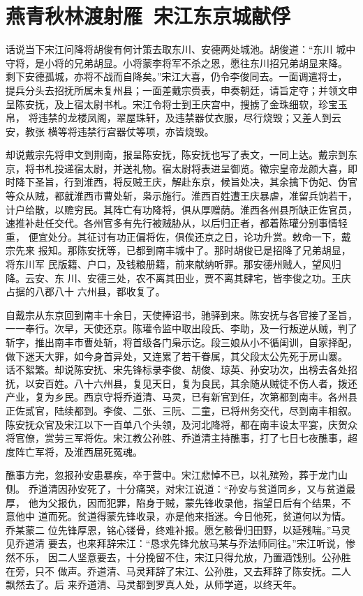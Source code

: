 \chapter{燕青秋林渡射雁~宋江东京城献俘}

话说当下宋江问降将胡俊有何计策去取东川、安德两处城池。胡俊道：“东川
城中守将，是小将的兄弟胡显。小将蒙李将军不杀之恩，愿往东川招兄弟胡显来降。
剩下安德孤城，亦将不战而自降矣。”宋江大喜，仍令李俊同去。一面调遣将士，
提兵分头去招抚所属未复州县；一面差戴宗赍表，申奏朝廷，请旨定夺；并领文申
呈陈安抚，及上宿太尉书札。宋江令将士到王庆宫中，搜掳了金珠细软，珍宝玉帛，
将违禁的龙楼凤阁，翠屋珠轩，及违禁器仗衣服，尽行烧毁；又差人到云安，教张
横等将违禁行宫器仗等项，亦皆烧毁。

却说戴宗先将申文到荆南，报呈陈安抚，陈安抚也写了表文，一同上达。戴宗到东
京，将书札投递宿太尉，并送礼物。宿太尉将表进呈御览。徽宗皇帝龙颜大喜，即
时降下圣旨，行到淮西，将反贼王庆，解赴东京，候旨处决，其余擒下伪妃、伪官
等众从贼，都就淮西市曹处斩，枭示施行。淮西百姓遭王庆暴虐，准留兵饷若干，
计户给散，以赡穷民。其阵亡有功降将，俱从厚赠荫。淮西各州县所缺正佐官员，
速推补赴任交代。各州官多有先行被贼胁从，以后归正者，都着陈瓘分别事情轻重，
便宜处分。其征讨有功正偏将佐，俱俟还京之日，论功升赏。敕命一下，戴宗先来
报知。那陈安抚等，已都到南丰城中了。那时胡俊已是招降了兄弟胡显，将东川军
民版籍、户口，及钱粮册籍，前来献纳听罪。那安德州贼人，望风归降。云安、东
川、安德三处，农不离其田业，贾不离其肆宅，皆李俊之功。王庆占据的八郡八十
六州县，都收复了。

自戴宗从东京回到南丰十余日，天使捧诏书，驰驿到来。陈安抚与各官接了圣旨，
一一奉行。次早，天使还京。陈瓘令监中取出段氏、李助，及一行叛逆从贼，判了
斩字，推出南丰市曹处斩，将首级各门枭示讫。段三娘从小不循闺训，自家择配，
做下迷天大罪，如今身首异处，又连累了若干眷属，其父段太公先死于房山寨。
话不絮繁。却说陈安抚、宋先锋标录李俊、胡俊、琼英、孙安功次，出榜去各处招
抚，以安百姓。八十六州县，复见天日，复为良民，其余随从贼徒不伤人者，拨还
产业，复为乡民。西京守将乔道清、马灵，已有新官到任，次第都到南丰。各州县
正佐贰官，陆续都到。李俊、二张、三阮、二童，已将州务交代，尽到南丰相叙。
陈安抚众官及宋江以下一百单八个头领，及河北降将，都在南丰设太平宴，庆贺众
将官僚，赏劳三军将佐。宋江教公孙胜、乔道清主持醮事，打了七日七夜醮事，超
度阵亡军将，及淮西屈死冤魂。

醮事方完，忽报孙安患暴疾，卒于营中。宋江悲悼不已，以礼殡殓，葬于龙门山侧。
乔道清因孙安死了，十分痛哭，对宋江说道：“孙安与贫道同乡，又与贫道最厚，
他为父报仇，因而犯罪，陷身于贼，蒙先锋收录他，指望日后有个结果，不意他中
道而死。贫道得蒙先锋收录，亦是他来指迷。今日他死，贫道何以为情。乔某蒙二
位先锋厚恩，铭心镂骨，终难补报。愿乞骸骨归田野，以延残喘。”马灵见乔道清
要去，也来拜辞宋江：“恳求先锋允放马某与乔法师同往。”宋江听说，惨然不乐，
因二人坚意要去，十分挽留不住，宋江只得允放，乃置酒饯别。公孙胜在旁，只不
做声。乔道清、马灵拜辞了宋江、公孙胜，又去拜辞了陈安抚。二人飘然去了。后
来乔道清、马灵都到罗真人处，从师学道，以终天年。

